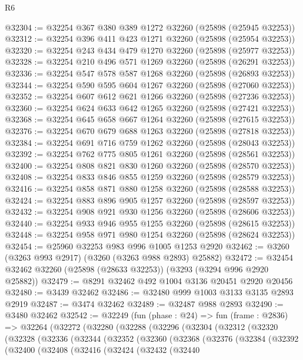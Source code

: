 \begin{lexlean}{R6}
\begin{coremodule}
@32304 := @32254 @367 @380 @389 @1272 @32260 (@25898 (@25945 @32253))
@32312 := @32254 @396 @411 @423 @1271 @32260 (@25898 (@25954 @32253))
@32320 := @32254 @243 @434 @479 @1270 @32260 (@25898 (@25977 @32253))
@32328 := @32254 @210 @496 @571 @1269 @32260 (@25898 (@26291 @32253))
@32336 := @32254 @547 @578 @587 @1268 @32260 (@25898 (@26893 @32253))
@32344 := @32254 @590 @595 @604 @1267 @32260 (@25898 (@27060 @32253))
@32352 := @32254 @607 @612 @621 @1266 @32260 (@25898 (@27236 @32253))
@32360 := @32254 @624 @633 @642 @1265 @32260 (@25898 (@27421 @32253))
@32368 := @32254 @645 @658 @667 @1264 @32260 (@25898 (@27615 @32253))
@32376 := @32254 @670 @679 @688 @1263 @32260 (@25898 (@27818 @32253))
@32384 := @32254 @691 @716 @759 @1262 @32260 (@25898 (@28043 @32253))
@32392 := @32254 @762 @775 @805 @1261 @32260 (@25898 (@28561 @32253))
@32400 := @32254 @808 @821 @830 @1260 @32260 (@25898 (@28570 @32253))
@32408 := @32254 @833 @846 @855 @1259 @32260 (@25898 (@28579 @32253))
@32416 := @32254 @858 @871 @880 @1258 @32260 (@25898 (@28588 @32253))
@32424 := @32254 @883 @896 @905 @1257 @32260 (@25898 (@28597 @32253))
@32432 := @32254 @908 @921 @930 @1256 @32260 (@25898 (@28606 @32253))
@32440 := @32254 @933 @946 @955 @1255 @32260 (@25898 (@28615 @32253))
@32448 := @32254 @958 @971 @980 @1254 @32260 (@25898 (@28624 @32253))
@32454 := @25960 @32253 @983 @996 @1005 @1253 @2920
@32462 := @3260 (@3263 @993 @2917) (@3260 (@3263 @988 @2893) @25882)
@32472 := @32454 @32462 @32260 (@25898 (@28633 @32253)) (@3293 (@3294 @996 @2920 @25882))
@32479 := @8291 @32462 @492 @1004 @3136 @20451 @2920 @20456
@32480 := @3439 @32462
@32486 := @32480 @999 @1003 @3133 @3135 @2893 @2919
@32487 := @3474 @32462
@32489 := @32487 @988 @2893
@32490 := @3480 @32462
@32542 := @32249
    (fun (phase : @24) =>
    fun (frame : @2836) =>
    @32264
      (@32272
        (@32280
          (@32288
            (@32296
              (@32304
                (@32312
                  (@32320
                    (@32328
                      (@32336
                        (@32344
                          (@32352
                            (@32360
                              (@32368
                                (@32376
                                  (@32384
                                    (@32392
                                      (@32400
                                        (@32408
                                          (@32416
                                            (@32424
                                              (@32432
                                                (@32440

\end{coremodule}
\end{lexlean}
